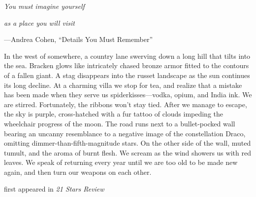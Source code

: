 \emph{You must imagine yourself}

\emph{as a place you will visit}

---Andrea Cohen, ``Details You Must Remember''

In the west of somewhere, a country lane swerving down a long hill that
tilts into the sea. Bracken glows like intricately chased bronze armor
fitted to the contours of a fallen giant. A stag disappears into the
russet landscape as the sun continues its long decline. At a charming
villa we stop for tea, and realize that a mistake has been made when
they serve us spiderkisses---vodka, opium, and India ink. We are
stirred. Fortunately, the ribbons won't stay tied. After we manage to
escape, the sky is purple, cross-hatched with a fur tattoo of clouds
impeding the wheelchair progress of the moon. The road runs next to a
bullet-pocked wall bearing an uncanny resemblance to a negative image of
the constellation Draco, omitting dimmer-than-fifth-magnitude stars. On
the other side of the wall, muted tumult, and the aroma of burnt flesh.
We scream as the wind showers us with red leaves. We speak of returning
every year until we are too old to be made new again, and then turn our
weapons on each other.

first appeared in \emph{21 Stars Review}
